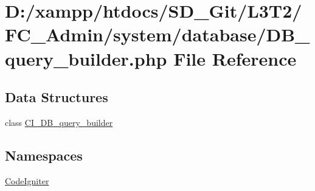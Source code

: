 \hypertarget{_d_b__query__builder_8php}{}\section{D\+:/xampp/htdocs/\+S\+D\+\_\+\+Git/\+L3\+T2/\+F\+C\+\_\+\+Admin/system/database/\+D\+B\+\_\+query\+\_\+builder.php File Reference}
\label{_d_b__query__builder_8php}
\subsection*{Data Structures}
\begin{DoxyCompactItemize}
\item 
class \hyperlink{class_c_i___d_b__query__builder}{C\+I\+\_\+\+D\+B\+\_\+query\+\_\+builder}
\end{DoxyCompactItemize}
\subsection*{Namespaces}
\begin{DoxyCompactItemize}
\item 
 \hyperlink{namespace_code_igniter}{Code\+Igniter}
\end{DoxyCompactItemize}
